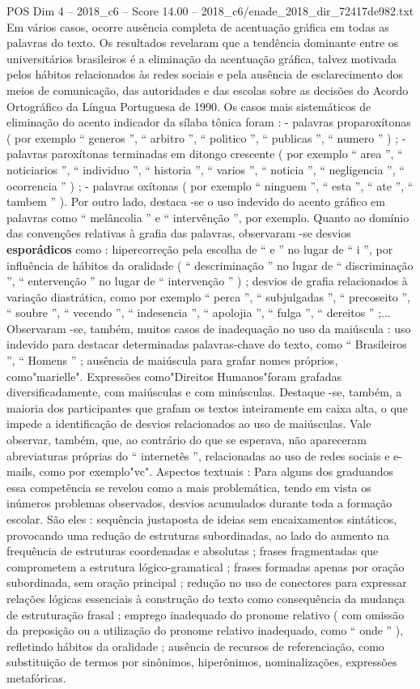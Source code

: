 \begin{textsample}{POS Dim 4 – 2018\_c6 – Score 14.00 – 2018\_c6/enade\_2018\_dir\_72417de982.txt}
Em vários casos, ocorre ausência completa de acentuação gráfica em todas as palavras do texto.
Os resultados revelaram que a tendência dominante entre os universitários brasileiros é a eliminação da acentuação gráfica, talvez motivada pelos hábitos relacionados às redes sociais e pela ausência de esclarecimento dos meios de comunicação, das autoridades e das escolas sobre as decisões do Acordo Ortográfico da Língua Portuguesa de 1990.
Os casos mais sistemáticos de eliminação do acento indicador da sílaba tônica foram : - palavras proparoxítonas ( por exemplo “ generos ”, “ arbitro ”, “ politico ”, “ publicas ”, “ numero ” ) ; - palavras paroxítonas terminadas em ditongo crescente ( por exemplo “ area ”, “ noticiarios ”, “ individuo ”, “ historia ”, “ varios ”, “ noticia ”, “ negligencia ”, “ ocorrencia ” ) ; - palavras oxítonas ( por exemplo “ ninguem ”, “ esta ”, “ ate ”, “ tambem ” ).
Por outro lado, destaca -se o uso indevido do acento gráfico em palavras como “ melâncolia ” e “ intervênção ”, por exemplo.
Quanto ao domínio das convenções relativas à grafia das palavras, observaram -se desvios \textbf{esporádicos} como : hipercorreção pela escolha de “ e ” no lugar de “ i ”, por influência de hábitos da oralidade ( “ descriminação ” no lugar de “ discriminação ”, “ entervenção ” no lugar de “ intervenção ” ) ; desvios de grafia relacionados à variação diastrática, como por exemplo “ perca ”, “ subjulgadas ”, “ precoseito ”, “ soubre ”, “ vecendo ”, “ indesencia ”, “ apolojia ”, “ fulga ”, “ dereitos ” ;...
Observaram -se, também, muitos casos de inadequação no uso da maiúscula : uso indevido para destacar determinadas palavras-chave do texto, como “ Brasileiros ”, “ Homens ” ; ausência de maiúscula para grafar nomes próprios, como"marielle".
Expressões como"Direitos Humanos"foram grafadas diversificadamente, com maiúsculas e com minúsculas.
Destaque -se, também, a maioria dos participantes que grafam os textos inteiramente em caixa alta, o que impede a identificação de desvios relacionados ao uso de maiúsculas.
Vale observar, também, que, ao contrário do que se esperava, não apareceram abreviaturas próprias do “ internetês ”, relacionadas ao uso de redes sociais e e-mails, como por exemplo"vc".
Aspectos textuais : Para alguns dos graduandos essa competência se revelou como a mais problemática, tendo em vista os inúmeros problemas observados, desvios acumulados durante toda a formação escolar.
São eles : sequência justaposta de ideias sem encaixamentos sintáticos, provocando uma redução de estruturas subordinadas, ao lado do aumento na frequência de estruturas coordenadas e absolutas ; frases fragmentadas que comprometem a estrutura lógico-gramatical ; frases formadas apenas por oração subordinada, sem oração principal ; redução no uso de conectores para expressar relações lógicas essenciais à construção do texto como consequência da mudança de estruturação frasal ; emprego inadequado do pronome relativo ( com omissão da preposição ou a utilização do pronome relativo inadequado, como “ onde ” ), refletindo hábitos da oralidade ; ausência de recursos de referenciação, como substituição de termos por sinônimos, hiperônimos, nominalizações, expressões metafóricas.

\end{textsample}
